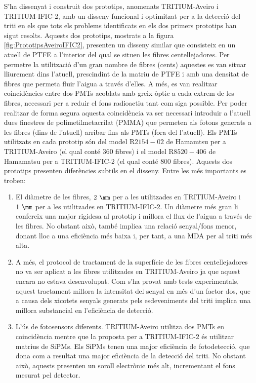 S'ha dissenyat i construit dos prototips, anomenats TRITIUM-Aveiro i TRITIUM-IFIC-2, amb un disseny funcional i optimitzat per a la detecció del triti en els que tots els problems identificats en els dos primers prototips han sigut resolts. Aquests dos prototips, mostrats a la figura \ref{fig:PrototipsAveiroIFIC2}, presenten un disseny similar que consisteix en un atuell de PTFE a l'interior del qual se situen les fibres centellejadores. Per permetre la utilització d'un gran nombre de fibres (cents) aquestes es van situar lliurement dins l'atuell, prescindint de la matriu de PTFE i amb una densitat de fibres que permeta fluir l'aigua a través d'elles. A més, es van realitzar coincidències entre dos PMTs acoblats amb greix òptic a cada extrem de les fibres, necessari per a reduir el fons radioactiu tant com siga possible. Per poder realitzar de forma segura aquesta coincidència va ser necessari introduir a l'atuell dues finestres de polimetilmetacrilat (PMMA) que permeten als fotons generats a les fibres (dins de l'atuell) arribar fins als PMTs (fora del l'atuell). Els PMTs utilitzats en cada prototip són del model R$2154-02$ de Hamamtsu \cite{DataSheetPMTsAveiro} per a TRITIUM-Aveiro (el qual conté 360 fibres) i el model R$8520-406$ de Hamamatsu \cite{DataSheetPMTs} per a TRITIUM-IFIC-2 (el qual conté 800 fibres). Aquests dos prototips presenten diferències subtils en el disseny. Entre les més importants es troben:
\begin{enumerate}
\item{} El diàmetre de les fibres, $2~\mm$ per a les utilitzades en TRITIUM-Aveiro i $1~\mm$ per a les utilitzades en TRITIUM-IFIC-2. Un diàmetre més gran li confereix una major rigidesa al prototip i millora el flux de l'aigua a través de les fibres. No obstant això, també implica una relació senyal/fons menor, donant lloc a una eficiència més baixa i, per tant, a una MDA per al triti més alta.
\item{} A més, el protocol de tractament de la superfície de les fibres centellejadores no va ser aplicat a les fibres utilitzades en TRITIUM-Aveiro ja que aquest encara no estava desenvolupat. Com s'ha provat amb tests experimentals, aquest tractament millora la intensitat del senyal en més d'un factor dos, que a causa dels xicotets senyals generats pels esdeveniments del triti implica una millora substancial en l'eficiència de detecció.
\item{} L'ús de fotosensors diferents. TRITIUM-Aveiro utilitza dos PMTs en coincidència mentre que la proposta per a TRITIUM-IFIC-2 és utilitzar matrius de SiPMs. Els SiPMs tenen una major eficiència de fotodetecció, que dona com a resultat una major eficiència de la detecció del triti. No obstant això, aquests presenten un soroll electrònic més alt, incrementant el fons mesurat pel detector. %
\end{enumerate} 
